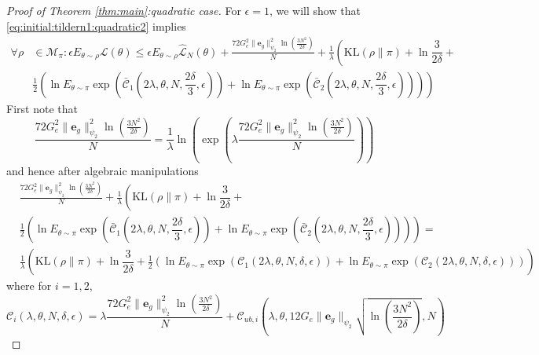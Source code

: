 \documentclass{article}
\newcommand{\KL}{\mathrm{KL}}
\renewcommand{\KL}{\mathrm{KL}}
\newcommand{\e}{\mathbf{e}}
\newcommand{\y}{\mathbf{y}}
\begin{document}
\begin{proof}[Proof of Theorem \ref{thm:main}:quadratic case]
   
  For $\epsilon=1$, we will show that \eqref{eq:initial:tildern1:quadratic2} implies
   \begin{equation}
        \label{eq:initial:tildern1:quadratic4} 
    \begin{aligned}
         \forall \rho & \in \mathcal{M}_\pi: \epsilon E_{\theta\sim\rho} \mathcal{L}(\theta)
         \leq   \epsilon E_{\theta\sim\rho} \hat{\mathcal{L}}_N(\theta) +   \frac{72G_e^2\|\e_g\|_{\psi_2}^2\ln\left(\frac{3N^2}{2\delta}\right)}{N} + %
          \frac{1}{\lambda}\left ( \KL(\rho\|\pi) + \ln\dfrac{3}{2\delta} + 
          \right. \\
          &\left. 
          \frac{1}{2} 
          \left(\ln E_{\theta\sim\pi} \exp(\mathcal{\bar{C}}_1(2\lambda,\theta,N,\dfrac{2\delta}{3},\epsilon))+
          \ln E_{\theta \sim \pi} \exp(\mathcal{\bar{C}}_2(2\lambda,\theta,N,\dfrac{2\delta}{3},\epsilon))\right) 
           \right )
    \end{aligned}
    \end{equation}
   First note that 
   \[ \frac{72G_e^2\|\e_g\|_{\psi_2}^2\ln\left(\frac{3N^2}{2\delta}\right)}{N}=\frac{1}{\lambda}\ln\left(\exp\left(\lambda \frac{72G_e^2\|\e_g\|_{\psi_2}^2\ln\left(\frac{3N^2}{2\delta}\right)}{N}\right)\right) 
   \]
   and hence after algebraic manipulations %
   \begin{align*}
    & \frac{72G_e^2\|\e_g\|_{\psi_2}^2\ln\left(\frac{3N^2}{2\delta}\right)}{N} +
    \frac{1}{\lambda}\left ( \KL(\rho\|\pi) + \ln\dfrac{3}{2\delta} + 
            \right. \\
          &\left. 
          \frac{1}{2} 
          \left(\ln E_{\theta\sim\pi} \exp(\mathcal{\bar{C}}_1(2\lambda,\theta,N,\dfrac{2\delta}{3},\epsilon))+
          \ln E_{\theta \sim \pi} \exp(\mathcal{\bar{C}}_2(2\lambda,\theta,N,\dfrac{2\delta}{3},\epsilon))\right)\right) = \\
    & \frac{1}{\lambda}\left ( \KL(\rho\|\pi) + \ln\dfrac{3}{2\delta} + 
          \frac{1}{2} 
          \left(\ln E_{\theta\sim\pi} \exp(\mathcal{C}_1(2\lambda,\theta,N,\delta,\epsilon))+
          \ln E_{\theta \sim \pi} \exp(\mathcal{C}_2(2\lambda,\theta,N,\delta,\epsilon))\right) \right)
   \end{align*}
    where for $i=1,2$, 
   \[ \mathcal{C}_i(\lambda,\theta,N,\delta,\epsilon)=
      \lambda \frac{72G_e^2\|\e_g\|_{\psi_2}^2\ln\left(\frac{3N^2}{2\delta}\right)}{N}
      + \mathcal{C}_{ub,i}(\lambda,\theta,12G_e\|\e_g\|_{\psi_2}\sqrt{\ln\left(\frac{3N^2}{2\delta}\right)},N)
   \]   



\end{proof}
\end{document}
